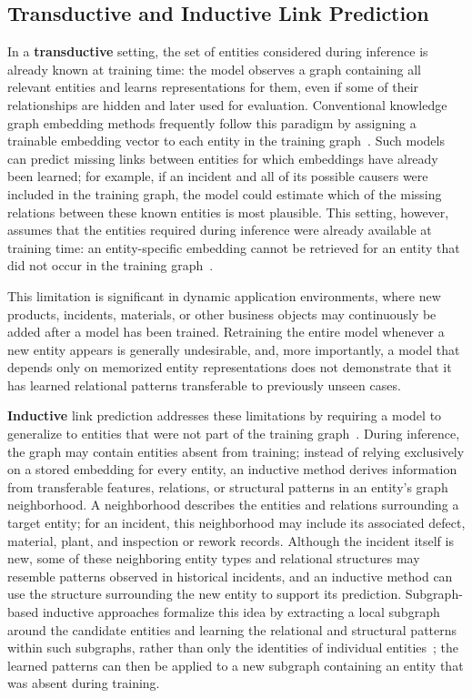 \subsection{Transductive and Inductive Link Prediction}\label{sec:fund_kg_transind}\label{sec:inductive}

In a \textbf{transductive} setting, the set of entities considered during
inference is already known at training time: the model observes a graph
containing all relevant entities and learns representations for them,
even if some of their relationships are hidden and later used for
evaluation. Conventional knowledge graph embedding methods frequently
follow this paradigm by assigning a trainable embedding vector to each
entity in the training graph~\cite{wang2017kgesurvey, teru2020grail}. Such
models can predict missing links between entities for which embeddings
have already been learned; for example, if an incident and all of its
possible causers were included in the training graph, the model could
estimate which of the missing relations between these known entities is
most plausible. This setting, however, assumes that the entities required
during inference were already available at training time: an
entity-specific embedding cannot be retrieved for an entity that did not
occur in the training graph~\cite{teru2020grail, rossi2021comparative}.

This limitation is significant in dynamic application environments, where
new products, incidents, materials, or other business objects may
continuously be added after a model has been trained. Retraining the
entire model whenever a new entity appears is generally undesirable, and,
more importantly, a model that depends only on memorized entity
representations does not demonstrate that it has learned relational
patterns transferable to previously unseen cases.

\textbf{Inductive} link prediction addresses these limitations by
requiring a model to generalize to entities that were not part of the
training graph~\cite{teru2020grail, galkin2022ilpc}. During inference, the
graph may contain entities absent from training; instead of relying
exclusively on a stored embedding for every entity, an inductive method
derives information from transferable features, relations, or structural
patterns in an entity's graph neighborhood. A neighborhood describes the
entities and relations surrounding a target entity; for an incident, this
neighborhood may include its associated defect, material, plant, and
inspection or rework records. Although the incident itself is new, some
of these neighboring entity types and relational structures may resemble
patterns observed in historical incidents, and an inductive method can
use the structure surrounding the new entity to support its prediction.
Subgraph-based inductive approaches formalize this idea by extracting a
local subgraph around the candidate entities and learning the relational
and structural patterns within such subgraphs, rather than only the
identities of individual entities~\cite{teru2020grail}; the learned
patterns can then be applied to a new subgraph containing an entity that
was absent during training.

